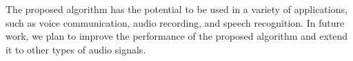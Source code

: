 \documentclass[conference]{IEEEtran}
\begin{document}
The proposed algorithm has the potential to be used in a variety of applications, such as voice communication, audio recording, and speech recognition. In future work, we plan to improve the performance of the proposed algorithm and extend it to other types of audio signals.



	
\end{document}
